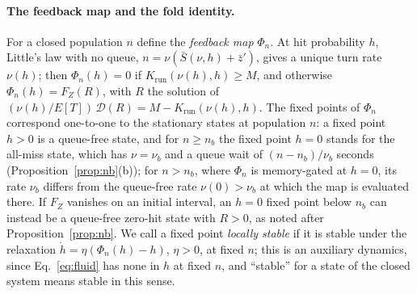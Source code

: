 \paragraph{The feedback map and the fold identity.} For a closed population $n$ define the \emph{feedback map} $\Phi_n$. At hit probability $h$, Little's law with no queue, $n=\nu(\bar S(\nu,h)+\bar z')$, gives a unique turn rate $\nu(h)$; then $\Phi_n(h)=0$ if $K_{\mathrm{run}}(\nu(h),h)\ge M$, and otherwise $\Phi_n(h)=F_Z(R)$, with $R$ the solution of $(\nu(h)/E[T])\,\mathcal D(R)=M-K_{\mathrm{run}}(\nu(h),h)$. The fixed points of $\Phi_n$ correspond one-to-one to the stationary states at population $n$: a fixed point $h>0$ is a queue-free state, and for $n\ge n_b$ the fixed point $h=0$ stands for the all-miss state, which has $\nu=\nu_b$ and a queue wait of $(n-n_b)/\nu_b$ seconds (Proposition~\ref{prop:nb}(b)); for $n>n_b$, where $\Phi_n$ is memory-gated at $h=0$, its rate $\nu_b$ differs from the queue-free rate $\nu(0)>\nu_b$ at which the map is evaluated there. If $F_Z$ vanishes on an initial interval, an $h=0$ fixed point below $n_b$ can instead be a queue-free zero-hit state with $R>0$, as noted after Proposition~\ref{prop:nb}. We call a fixed point \emph{locally stable} if it is stable under the relaxation $\dot h=\eta(\Phi_n(h)-h)$, $\eta>0$, at fixed $n$; this is an auxiliary dynamics, since Eq.~\eqref{eq:fluid} has none in $h$ at fixed $n$, and ``stable'' for a state of the closed system means stable in this sense.

